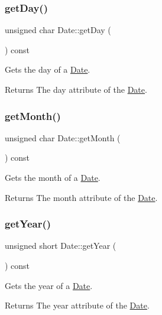 \subsubsection{\texorpdfstring{get\+Day()}{getDay()}}
{\footnotesize\ttfamily unsigned char Date\+::get\+Day (\begin{DoxyParamCaption}{ }\end{DoxyParamCaption}) const}



Gets the day of a \hyperlink{classDate}{Date}. 

\begin{DoxyReturn}{Returns}
The day attribute of the \hyperlink{classDate}{Date}. 
\end{DoxyReturn}
\mbox{\label{classDate_a19533fb2b887fb8a22bf7a8b883cea12}} 
\subsubsection{\texorpdfstring{get\+Month()}{getMonth()}}
{\footnotesize\ttfamily unsigned char Date\+::get\+Month (\begin{DoxyParamCaption}{ }\end{DoxyParamCaption}) const}



Gets the month of a \hyperlink{classDate}{Date}. 

\begin{DoxyReturn}{Returns}
The month attribute of the \hyperlink{classDate}{Date}. 
\end{DoxyReturn}
\mbox{\label{classDate_a49eb7170cfb5b39f7d6dc4308fdc1f57}} 
\subsubsection{\texorpdfstring{get\+Year()}{getYear()}}
{\footnotesize\ttfamily unsigned short Date\+::get\+Year (\begin{DoxyParamCaption}{ }\end{DoxyParamCaption}) const}



Gets the year of a \hyperlink{classDate}{Date}. 

\begin{DoxyReturn}{Returns}
The year attribute of the \hyperlink{classDate}{Date}. 
\end{DoxyReturn}
\mbox{\label{classDate_aca089c2b36cc384dfa7902d64383a193}} 
